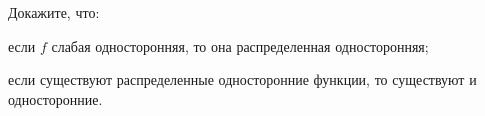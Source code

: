 Докажите, что:
\begin{enumcyr}
    \item если $f$ слабая односторонняя, то она распределенная односторонняя;
    \item если существуют распределенные односторонние функции, то существуют и односторонние.
\end{enumcyr}